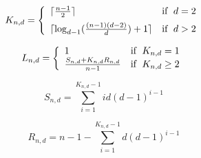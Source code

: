 \documentclass[graybox]{svmult}
\begin{document}
\begin{equation*}
K_{n,d} = \left\{
\begin{array}{ll}
\lceil \frac{n-1}{2} \rceil  & {\rm if}\phantom{a} d = 2 \\[5pt]
\lceil \log_{d-1} (\frac{(n-1)(d-2)}{d}) + 1 \rceil  & {\rm if}\phantom{a} d > 2
\end{array}
\right.
\end{equation*}

\begin{equation*}
L_{n,d} = \left\{
\begin{array}{ll}
1 & {\rm if}\phantom{a} K_{n,d} = 1 \\
\frac{S_{n,d}+K_{n,d}R_{n,d}}{n-1} & {\rm if}\phantom{a} K_{n,d} \geq 2
\end{array}
\right.
\end{equation*}

\begin{equation*}
S_{n,d} =
\sum_{i=1}^{K_{n,d}-1}  id(d-1)^{i-1} 
\end{equation*}

\begin{equation*}
R_{n,d} = n - 1 - 
\sum_{i=1}^{K_{n,d}-1}  d(d-1)^{i-1} 
\end{equation*}
\end{document}
